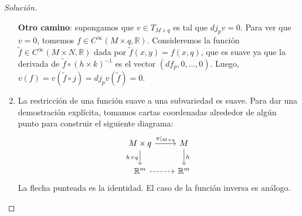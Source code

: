 \documentclass[spanish]{book}
\theoremstyle{definition}
\newcommand{\R}{\mathbb{R}}
\newcommand{\Cinf}{C^\infty}
\begin{document}
\begin{proof}[Solución]
\begin{enumerate}
			\textbf{Otro camino}: supongamos que $v\in T_{M\times q}$ es tal que $dj_pv=0$. Para ver que $v=0$, tomemos $f\in\Cinf(M\times q,\R)$. Consideremos la función $\tilde{f}\in\Cinf(M\times N,\R)$ dada por $\tilde{f}(x,y)=f(x,q)$, que es suave ya que la derivada de $\tilde{f}\circ(h\times k)^{-1}$ es el vector $(df_p,0,\ldots,0)$. Luego, $v(f)=v(\tilde{f}\circ j)=dj_pv(\tilde{f})=0$.
			\item La restricción de una función suave a una subvariedad es suave. Para dar una demostración explícita, tomamos cartas coordenadas alrededor de algún punto para construir el siguiente diagrama:
			\[\begin{tikzcd}
				M\times q\arrow{r}{\pi|_{M\times q}}\arrow[swap]{d}{h\times q}&M\arrow{d}{h}\\
				\R^m\arrow[dashed]{r}&\R^m
			\end{tikzcd}\]
			La flecha punteada es la identidad. El caso de la función inversa es análogo.
		\end{enumerate}
	\end{proof}
\end{document}
